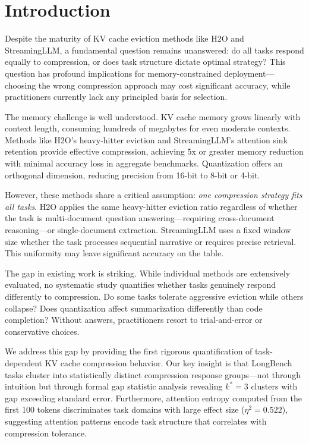 \section{Introduction}

Despite the maturity of KV cache eviction methods like H2O and StreamingLLM, a fundamental question remains unanswered: do all tasks respond equally to compression, or does task structure dictate optimal strategy? This question has profound implications for memory-constrained deployment---choosing the wrong compression approach may cost significant accuracy, while practitioners currently lack any principled basis for selection.

The memory challenge is well understood. KV cache memory grows linearly with context length, consuming hundreds of megabytes for even moderate contexts. Methods like H2O's heavy-hitter eviction and StreamingLLM's attention sink retention provide effective compression, achieving 5x or greater memory reduction with minimal accuracy loss in aggregate benchmarks. Quantization offers an orthogonal dimension, reducing precision from 16-bit to 8-bit or 4-bit.

However, these methods share a critical assumption: \emph{one compression strategy fits all tasks}. H2O applies the same heavy-hitter eviction ratio regardless of whether the task is multi-document question answering---requiring cross-document reasoning---or single-document extraction. StreamingLLM uses a fixed window size whether the task processes sequential narrative or requires precise retrieval. This uniformity may leave significant accuracy on the table.

The gap in existing work is striking. While individual methods are extensively evaluated, no systematic study quantifies whether tasks genuinely respond differently to compression. Do some tasks tolerate aggressive eviction while others collapse? Does quantization affect summarization differently than code completion? Without answers, practitioners resort to trial-and-error or conservative choices.

We address this gap by providing the first rigorous quantification of task-dependent KV cache compression behavior. Our key insight is that LongBench tasks cluster into statistically distinct compression response groups---not through intuition but through formal gap statistic analysis revealing $k^*=3$ clusters with gap exceeding standard error. Furthermore, attention entropy computed from the first 100 tokens discriminates task domains with large effect size ($\eta^2=0.522$), suggesting attention patterns encode task structure that correlates with compression tolerance.

